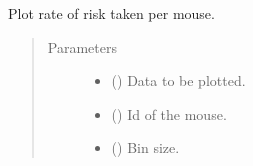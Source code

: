 \documentclass[letterpaper,10pt,english]{sphinxmanual}
\begin{document}
\begin{fulllineitems}
\label{\detokenize{NoSeMazeControl/Analysis:Analysis.Performance.show_risk_per_mouse}}
\pysigstartsignatures
{}
\pysigstopsignatures
\sphinxAtStartPar
Plot rate of risk taken per mouse.
\begin{quote}\begin{description}
\item[{Parameters}] \leavevmode\begin{itemize}
\item {} 
\sphinxAtStartPar
{} () \textendash{} Data to be plotted.

\item {} 
\sphinxAtStartPar
{} () \textendash{} Id of the mouse.

\item {} 
\sphinxAtStartPar
{} () \textendash{} Bin size.

\end{itemize}

\end{description}\end{quote}

\end{fulllineitems}

\end{document}
